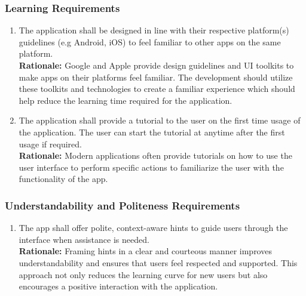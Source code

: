 \documentclass[]{article}
\begin{document}
\begin{enumerate}[{\bf BE1.}]
\subsubsection{Learning Requirements}
\label{ssub:learning_requirements}
\begin{enumerate}[{UH-L}1. ]
	\item The application shall be designed in line with their respective platform(s) guidelines (e.g Android, iOS) to feel familiar to other apps on the same platform.\\
	\textbf{Rationale:} Google and Apple provide design guidelines and UI toolkits to make apps on their platforms feel familiar. The development should utilize these toolkits
	and technologies to create a familiar experience which should help reduce the learning time required for the application.
	\item The application shall provide a tutorial to the user on the first time usage of the application. The user can start the tutorial at anytime after the first usage if required.\\
	\textbf{Rationale:} Modern applications often provide tutorials on how to use the user interface to perform specific actions to familiarize the user with the functionality of the app.
\end{enumerate}

\subsubsection{Understandability and Politeness Requirements}
\label{ssub:understandability_and_politeness_requirements}
\begin{enumerate}[{UH-UP}1. ]
	\item The app shall offer polite, context-aware hints to guide users through the interface when assistance is needed.\\
	\textbf{Rationale:} Framing hints in a clear and courteous manner improves understandability and ensures that users feel respected and supported. This approach not only reduces the learning curve for new users but also encourages a positive interaction with the application.
\end{enumerate}


\end{enumerate}
\end{document}
